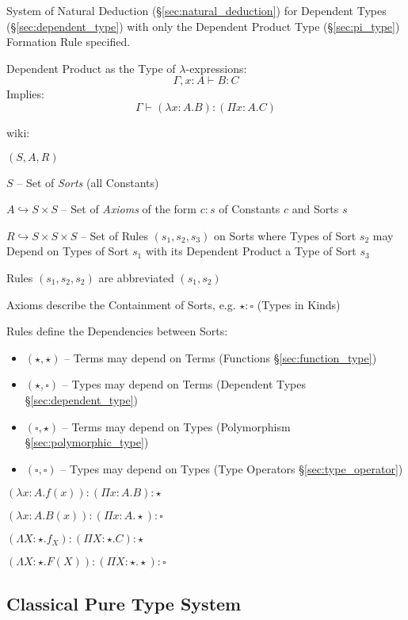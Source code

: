 System of Natural Deduction (\S\ref{sec:natural_deduction}) for
Dependent Types (\S\ref{sec:dependent_type}) with only the Dependent
Product Type (\S\ref{sec:pi_type}) Formation Rule specified.

Dependent Product as the Type of $\lambda$-expressions:
\[
  \Gamma,x:A \vdash B:C
\]
Implies:
\[
  \Gamma \vdash (\lambda x:A.B):(\Pi x:A.C)
\]


\asterism


wiki:

$(S,A,R)$

$S$ -- Set of \emph{Sorts} (all Constants)

$A \hookrightarrow S \times S$ -- Set of \emph{Axioms} of the form
$c:s$ of Constants $c$ and Sorts $s$

$R \hookrightarrow S \times S \times S$ -- Set of Rules
$(s_1,s_2,s_3)$ on Sorts where Types of Sort $s_2$ may Depend on Types
of Sort $s_1$ with its Dependent Product a Type of Sort $s_3$

Rules $(s_1,s_2,s_2)$ are abbreviated
$(s_1,s_2)$

Axioms describe the Containment of Sorts, e.g. $\star:\square$ (Types
in Kinds)

Rules define the Dependencies between Sorts:
\begin{itemize}
  \item $(\star,\star)$ -- Terms may depend on Terms (Functions
    \S\ref{sec:function_type})
  \item $(\star,\square)$ -- Types may depend on Terms (Dependent
    Types \S\ref{sec:dependent_type})
  \item $(\square,\star)$ -- Terms may depend on Types (Polymorphism
    \S\ref{sec:polymorphic_type})
  \item $(\square,\square)$ -- Types may depend on Types (Type
    Operators \S\ref{sec:type_operator})
\end{itemize}

$(\lambda x:A.f(x)):(\Pi x:A.B):\star$

$(\lambda x:A.B(x)):(\Pi x:A.\star):\square$

$(\Lambda X:\star.f_X):(\Pi X:\star.C):\star$

$(\Lambda X:\star.F(X)):(\Pi X:\star.\star):\square$



\subsection{Classical Pure Type System}\label{sec:cpts}

